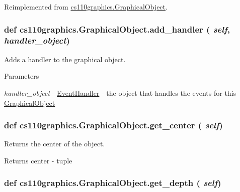 Reimplemented from \hyperlink{classcs110graphics_1_1GraphicalObject}{cs110graphics.GraphicalObject}.\hypertarget{classcs110graphics_1_1GraphicalObject_adb1af0d5a6baae3f9a08d21a3227c49f}{
\subsubsection[{add\_\-handler}]{\setlength{\rightskip}{0pt plus 5cm}def cs110graphics.GraphicalObject.add\_\-handler ( {\em self}, \/   {\em handler\_\-object})}}
\label{classcs110graphics_1_1GraphicalObject_adb1af0d5a6baae3f9a08d21a3227c49f}


Adds a handler to the graphical object. 
\begin{DoxyParams}{Parameters}
\item[{\em handler\_\-object}]-\/ \hyperlink{classcs110graphics_1_1EventHandler}{EventHandler} -\/ the object that handles the events for this \hyperlink{classcs110graphics_1_1GraphicalObject}{GraphicalObject} \end{DoxyParams}
\hypertarget{classcs110graphics_1_1GraphicalObject_a062789c4cc9de38af32dcc4ff2058607}{
\subsubsection[{get\_\-center}]{\setlength{\rightskip}{0pt plus 5cm}def cs110graphics.GraphicalObject.get\_\-center ( {\em self})}}
\label{classcs110graphics_1_1GraphicalObject_a062789c4cc9de38af32dcc4ff2058607}


Returns the center of the object. \begin{DoxyReturn}{Returns}
center -\/ tuple 
\end{DoxyReturn}
\hypertarget{classcs110graphics_1_1GraphicalObject_a6d9f5718cd0cf249e0d2842971bae17f}{
\subsubsection[{get\_\-depth}]{\setlength{\rightskip}{0pt plus 5cm}def cs110graphics.GraphicalObject.get\_\-depth ( {\em self})}}
\label{classcs110graphics_1_1GraphicalObject_a6d9f5718cd0cf249e0d2842971bae17f}


